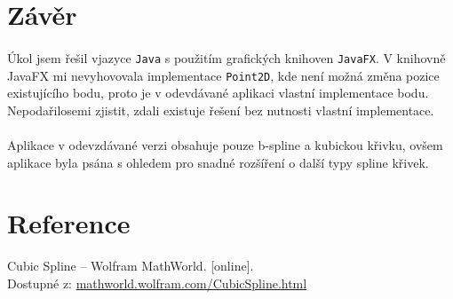 \documentclass[12pt]{scrartcl}
\begin{document}
\newpage
\section{Závěr}
\paragraph{}
Úkol jsem řešil v\nobreakspace jazyce \texttt{Java} s použitím grafických knihoven \texttt{JavaFX}. V knihovně JavaFX mi nevyhovovala implementace \texttt{Point2D}, kde není možná změna pozice existujícího bodu, proto je v odevdávané aplikaci vlastní implementace bodu. Nepodařilo\nobreakspace se\nobreakspace mi zjistit, zdali existuje řešení bez nutnosti vlastní implementace.
\paragraph{}
Aplikace v odevzdávané verzi obsahuje pouze b-spline a kubickou křivku, ovšem aplikace byla psána s ohledem pro snadné rozšíření o další typy spline křivek. 

\section{Reference}

Cubic Spline – Wolfram MathWorld. [online].\\ Dostupné z: \href{http://mathworld.wolfram.com/CubicSpline.html}{mathworld.wolfram.com/CubicSpline.html}
\end{document}
